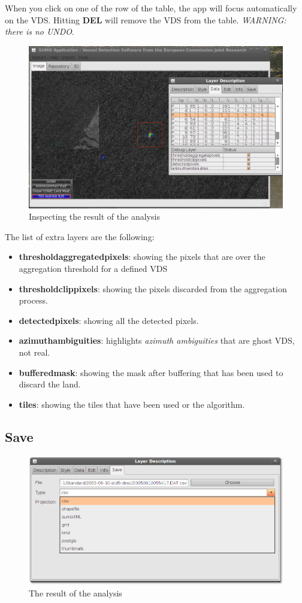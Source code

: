 \documentclass[12pt,a4paper,final]{report}
\begin{document}
When you click on one of the row of the table, the app will focus automatically on the VDS.
Hitting \textbf{DEL} will remove the VDS from the table.
\emph{WARNING: there is no UNDO}.
\begin{figure}[H]
 \centering
 \includegraphics[scale=0.45,keepaspectratio=true]{./images/VDSInspection.png}
 \caption{Inspecting the result of the analysis}
\end{figure}

The list of extra layers are the following:
\begin{itemize}
 \item \textbf{thresholdaggregatedpixels}: showing the pixels that are over the aggregation threshold for a defined VDS
 \item \textbf{thresholdclippixels}: showing the pixels discarded from the aggregation process.
 \item \textbf{detectedpixels}: showing all the detected pixels.
 \item \textbf{azimuthambiguities}: highlights \emph{azimuth ambiguities} that are ghost VDS, not real.
 \item \textbf{bufferedmask}: showing the mask after buffering that has been used to discard the land.
 \item \textbf{tiles}: showing the tiles that have been used or the algorithm.
\end{itemize}

\subsection{Save}
\begin{figure}[H]
 \centering
 \includegraphics[scale=0.45,keepaspectratio=true]{./images/VDS9.png}
 \caption{The result of the analysis}
\end{figure}
\end{document}
